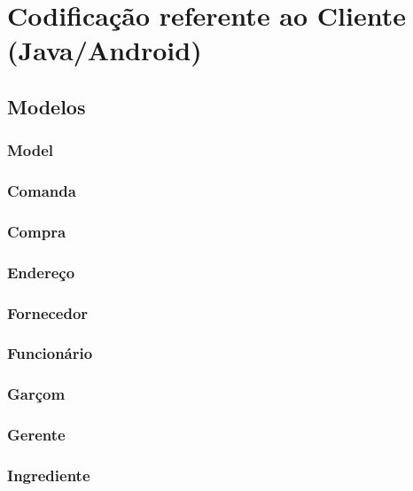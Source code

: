 \section{Codificação referente ao Cliente (Java/Android)}

\subsection{Modelos}

\subsubsection{Model}

\subsubsection{Comanda}

\subsubsection{Compra}

\subsubsection{Endereço}

\subsubsection{Fornecedor}

\subsubsection{Funcionário}

\subsubsection{Garçom}

\subsubsection{Gerente}

\subsubsection{Ingrediente}

